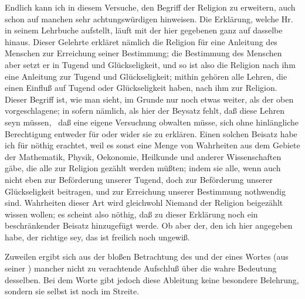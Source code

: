 \begin{aufza}
\item Endlich kann ich in diesem Versuche, den Begriff der Religion zu erweitern, auch schon auf manchen sehr achtungswürdigen  hinweisen. Die Erklärung, welche Hr.~ in seinem Lehrbuche aufstellt, läuft mit der hier gegebenen ganz auf dasselbe hinaus. Dieser Gelehrte erkläret nämlich die Religion für eine Anleitung des Menschen zur Erreichung seiner Bestimmung; die Bestimmung des Menschen aber setzt er in Tugend und Glückseligkeit, und so ist also die Religion nach ihm eine Anleitung zur Tugend und Glückseligkeit; mithin gehören alle Lehren, die einen Einfluß auf Tugend oder Glückseligkeit haben, nach ihm zur Religion. Dieser Begriff ist, wie man sieht, im Grunde nur noch etwas weiter, als der oben vorgeschlagene; in sofern nämlich, als hier der Beysatz fehlt, daß diese Lehren  seyn müssen, \dh\ daß eine eigene Versuchung obwalten müsse, sich ohne hinlängliche Berechtigung entweder für oder wider sie zu erklären. Einen solchen Beisatz habe ich für nöthig erachtet, weil es sonst eine Menge von Wahrheiten aus dem Gebiete der Mathematik, Physik, Oekonomie, Heilkunde und anderer Wissenschaften gäbe, die alle zur Religion gezählt werden müßten; indem sie alle, wenn auch nicht eben zur Beförderung unserer Tugend, doch zur Beförderung unserer Glückseligkeit beitragen, und zur Erreichung unserer Bestimmung nothwendig sind. Wahrheiten dieser Art wird gleichwohl Niemand der Religion beigezählt wissen wollen; es scheint also nöthig, daß zu dieser Erklärung noch ein beschränkender Beisatz hinzugefügt werde. Ob aber der, den ich hier angegeben habe, der richtige sey, das ist freilich noch ungewiß.~
\end{aufza}
\begin{RWanm}
Zuweilen ergibt sich aus der bloßen Betrachtung des  und der  eines Wortes (aus seiner ) mancher nicht zu verachtende Aufschluß über die wahre Bedeutung desselben. Bei dem Worte  gibt jedoch diese Ableitung keine besondere Belehrung, sondern sie selbst ist noch im Streite.
\end{RWanm}


